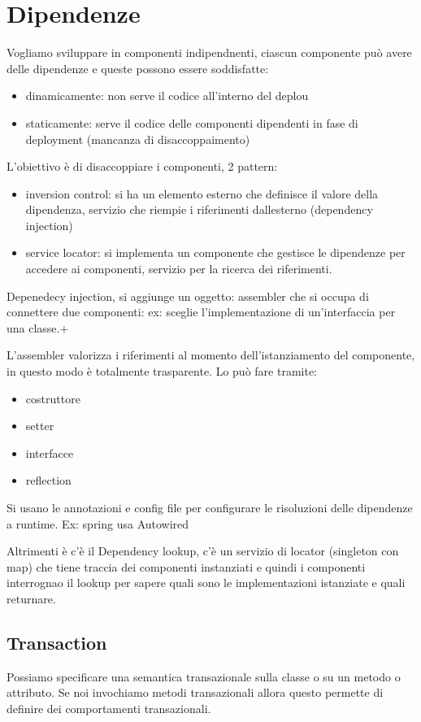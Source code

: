 \chapter{Dipendenze}
Vogliamo sviluppare in componenti indipendnenti, ciascun componente
può avere delle dipendenze e queste possono essere soddisfatte:
\begin{itemize}
    \item dinamicamente: non serve il codice all'interno del deplou
    \item staticamente: serve il codice delle componenti dipendenti in fase di
    deployment (mancanza di disaccoppaimento)
\end{itemize}

L'obiettivo è di disaccoppiare i componenti, 2 pattern:
\begin{itemize}
    \item inversion control: si ha un elemento esterno che definisce il valore 
    della dipendenza, servizio che riempie i riferimenti dallesterno (dependency injection)
    \item service locator: si implementa un componente che gestisce le dipendenze
    per accedere ai componenti, servizio per la ricerca dei riferimenti.
\end{itemize}

Depenedecy injection, si aggiunge un oggetto: assembler che si occupa di connettere
due componenti: ex: sceglie l'implementazione di un'interfaccia per una classe.+

L'assembler valorizza i riferimenti al momento dell'istanziamento del componente, 
in questo modo è totalmente trasparente. Lo può fare tramite:
\begin{itemize}
    \item costruttore
    \item setter
    \item interfacce
    \item reflection
\end{itemize}
Si usano le annotazioni e config file per configurare le risoluzioni delle dipendenze 
a runtime. Ex: spring usa Autowired 



Altrimenti è c'è il Dependency lookup, c'è un servizio di locator (singleton con map)
che tiene traccia dei componenti instanziati e quindi i componenti interrognao il lookup per 
sapere quali sono le implementazioni istanziate e quali returnare.


\section{Transaction}
Possiamo specificare una semantica transazionale sulla classe o su un metodo o attributo.
Se noi invochiamo metodi transazionali allora questo permette di definire dei comportamenti
transazionali.

